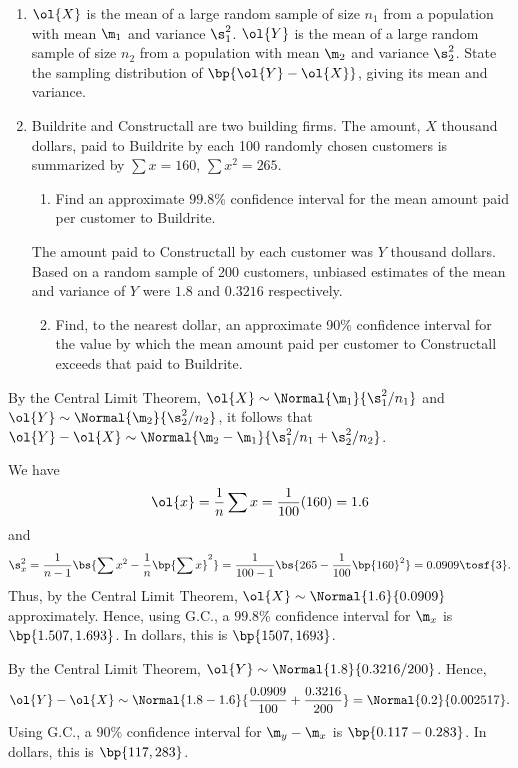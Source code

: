\begin{problem}
    \begin{enumerate}
        \item $\ol{X}$ is the mean of a large random sample of size $n_1$ from a population with mean $\m_1$ and variance $\s_1^2$. $\ol{Y}$ is the mean of a large random sample of size $n_2$ from a population with mean $\m_2$ and variance $\s_2^2$. State the sampling distribution of $\bp{\ol{Y}-\ol{X}}$, giving its mean and variance.
        \item Buildrite and Constructall are two building firms. The amount, $X$ thousand dollars, paid to Buildrite by each 100 randomly chosen customers is summarized by $\sum x = 160$, $\sum x^2 = 265$.
        \begin{enumerate}
            \item Find an approximate $99.8$\% confidence interval for the mean amount paid per customer to Buildrite.
        \end{enumerate}
        The amount paid to Constructall by each customer was $Y$ thousand dollars. Based on a random sample of 200 customers, unbiased estimates of the mean and variance of $Y$ were $1.8$ and $0.3216$ respectively.
        \begin{enumerate}
            \setcounter{enumii}{1}
            \item Find, to the nearest dollar, an approximate 90\% confidence interval for the value by which the mean amount paid per customer to Constructall exceeds that paid to Buildrite.
        \end{enumerate}
    \end{enumerate}
\end{problem}
\begin{solution}
    \begin{ppart}
        By the Central Limit Theorem, $\ol{X} \sim \Normal{\m_1}{\s_1^2/n_1}$ and $\ol{Y} \sim \Normal{\m_2}{\s_2^2/n_2}$, it follows that $\ol{Y} - \ol{X} \sim \Normal{\m_2 - \m_1}{\s_1^2/n_1 + \s_2^2/n_2}$.
    \end{ppart}
    \begin{ppart}
        \begin{psubpart}
            We have \[\ol{x} = \frac1n \sum x = \frac1{100} (160) = 1.6\] and \[\s_x^2 = \frac1{n-1} \bs{\sum x^2 - \frac1n \bp{\sum x}^2} = \frac1{100-1} \bs{265 - \frac1{100} \bp{160}^2} = 0.0909 \tosf{3}.\] Thus, by the Central Limit Theorem, $\ol{X} \sim \Normal{1.6}{0.0909}$ approximately. Hence, using G.C., a $99.8$\% confidence interval for $\m_x$ is $\bp{1.507, 1.693}$. In dollars, this is $\bp{1507, 1693}$.
        \end{psubpart}
        \begin{psubpart}
            By the Central Limit Theorem, $\ol{Y} \sim \Normal{1.8}{0.3216/200}$. Hence, \[\ol{Y} - \ol{X} \sim \Normal{1.8-1.6}{\frac{0.0909}{100} + \frac{0.3216}{200}} = \Normal{0.2}{0.002517}.\] Using G.C., a 90\% confidence interval for $\m_y - \m_x$ is $\bp{0.117 - 0.283}$. In dollars, this is $\bp{117, 283}$.
        \end{psubpart}
    \end{ppart}
\end{solution}

